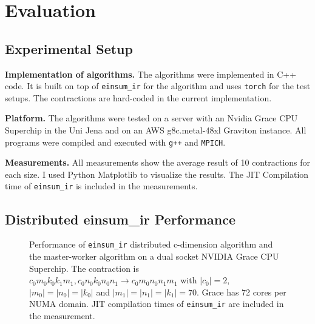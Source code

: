 \section{Evaluation}

\subsection{Experimental Setup}

\textbf{Implementation of algorithms.}
The algorithms were implemented in C++ code.
It is built on top of \texttt{einsum\_ir} for the algorithm and uses \texttt{torch} for the test setups.
The contractions are hard-coded in the current implementation.

\textbf{Platform.}
The algorithms were tested on a server with an Nvidia Grace CPU Superchip in the Uni Jena and on an AWS g8c.metal-48xl Graviton instance.
All programs were compiled and executed with \texttt{g++} and \texttt{MPICH}.

\textbf{Measurements.}
All measurements show the average result of 10 contractions for each size.
I used Python Matplotlib\cite{matplotlib} to visualize the results.
The JIT Compilation time of \texttt{einsum\_ir} is included in the measurements.


\subsection{Distributed einsum\_ir Performance}

\begin{figure}[ht]
  \caption{
    Performance of \texttt{einsum\_ir} distributed c-dimension algorithm and the master-worker algorithm on a dual socket NVIDIA Grace CPU Superchip.
    The contraction is $c_0m_0k_0k_1m_1, c_0n_0k_0n_0n_1 \rightarrow c_0m_0n_0n_1m_1$ with $|c_0|=2$, $|m_0|=|n_0|=|k_0|$ and $|m_1|=|n_1|=|k_1|=70$.
    Grace has 72 cores per NUMA domain.
    JIT compilation times of \texttt{einsum\_ir} are included in the measurement.
    }
  \label{fig:master_worker_perf}
\end{figure}

